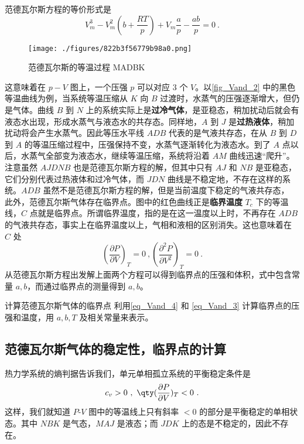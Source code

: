 范德瓦尔斯方程的等价形式是
\begin{equation}\label{eq_Vand_4}
V_m^3-V_m^2(b+\frac{RT}{p})+V_m\frac{a}{p}-\frac{ab}{p}=0~.
\end{equation}

\begin{figure}[ht]
\centering
\texttt{[image: ./figures/822b3f56779b98a0.png]}
\caption{范德瓦尔斯的等温过程 MADBK} \label{fig_Vand_2}
\end{figure}


这意味着在 $p-V$ 图上，一个压强 $p$ 可以对应 $3$ 个 $V$。以\autoref{fig_Vand_2} 中的黑色等温曲线为例，当系统等温压缩从 $K$ 向 $B$ 过渡时，水蒸气的压强逐渐增大，但仍是气体。曲线 $B$ 到 $N$ 上的系统实际上是\textbf{过冷气体}，是亚稳态，稍加扰动后就会有液态水出现，形成水蒸气与液态水的共存态。同样地，$A$ 到 $J$ 是\textbf{过热液体}，稍加扰动将会产生水蒸气。因此等压水平线 $ADB$ 代表的是气液共存态，在从 $B$ 到 $D$ 到 $A$ 的等温压缩过程中，压强保持不变，水蒸气逐渐转化为液态水。到了 $A$ 点以后，水蒸气全部变为液态水，继续等温压缩，系统将沿着 $AM$ 曲线迅速“爬升”。注意虽然 $AJDNB$ 也是范德瓦尔斯方程的解，但其中只有 $AJ$ 和 $NB$ 是亚稳态，它们分别代表过热液体和过冷气体，而 $JDN$ 曲线是不稳定地，不存在这样的系统。$ADB$ 虽然不是范德瓦尔斯方程的解，但是当前温度下稳定的气液共存态，
此外，范德瓦尔斯气体存在临界点。图中的红色曲线正是\textbf{临界温度} $T_c$ 下的等温线，$C$ 点就是临界点。所谓临界温度，指的是在这一温度以上时，不再存在 $ADB$ 的气液共存态，事实上在临界温度以上，气相和液相的区别消失。这也意味着在 $C$ 处
\begin{equation}\label{eq_Vand_3}
\left(\frac{\partial P}{\partial V}\right)_T=0~,
\left(\frac{\partial^2 P}{\partial V^2}\right)_T=0~.
\end{equation}
从范德瓦尔斯方程出发解上面两个方程可以得到临界点的压强和体积，式中包含常量 $a,b$，而通过临界点的测量得到 $a,b$。
\begin{exercise}{计算范德瓦尔斯气体的临界点}
利用\autoref{eq_Vand_4} 和 \autoref{eq_Vand_3} 计算临界点的压强和温度，用 $a,b,T$ 及相关常量来表示。
\end{exercise}
\subsection{范德瓦尔斯气体的稳定性，临界点的计算}
热力学系统的熵判据告诉我们，单元单相孤立系统的平衡稳定条件是
\begin{equation}\label{eq_Vand_1}
c_v>0~,\ \qty(\frac{\partial P}{\partial V})_T<0~.
\end{equation}
这样，我们就知道 $P$-$V$ 图中的等温线上只有斜率 $<0$ 的部分是平衡稳定的单相状态。其中 $NBK$ 是气态，$MAJ$ 是液态；而 $JDK$ 上的态是不稳定的，因此不存在。


